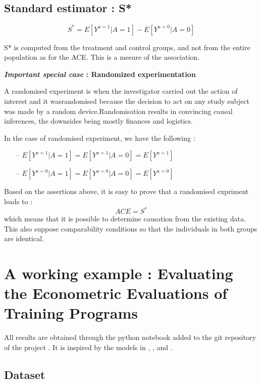 \documentclass{article}
\begin{document}
\subsection{Standard estimator : S*}

$$ S^{*} = E[Y^{a=1}|A=1] - E[Y^{a=0}|A=0] $$

S* is computed from the treatment and control groups, and not from the entire population as for the ACE. This is a mesure of the association.

\textbf{\textit{Important special case} : Randomized experimentation}
 
A randomised experiment is when the investigator carried out the action of interest and it wasrandomised because the decision to act on any study subject was made by a random device.Randomisation results in convincing causal inferences, the downsides being mostly finances and logistics.

In the case of randomised experiment, we have the following : 

\begin{itemize}
\item[--] $ E[Y^{a=1}|A=1] =  E[Y^{a=1}|A=0] =  E[Y^{a=1}] $
\item[--] $ E[Y^{a=0}|A=1] =  E[Y^{a=0}|A=0] =  E[Y^{a=0}] $
\end{itemize}

Based on the assertions above, it is easy to prove that a randomised expriment leads to  : $$ ACE = S^{*} $$ which means that it is possible to determine causation from the existing data. This also suppose comparability conditions so that the individuals in both groups are identical.


\newpage
 \section{A working example : Evaluating the Econometric Evaluations of Training Programs }
 
 All results are obtained through the python notebook added to the git repository of the project \cite{ourGithub}.
 It is inspired by the models in \cite{lalondeDowhy} , \cite{ijmbarrExample}, and \cite{rugg2Example}.
 
 
 
 
 
 
 \subsection{ Dataset}
 
\end{document}
